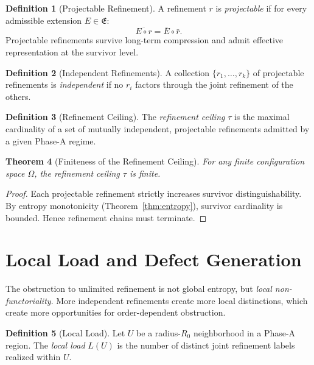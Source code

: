 \documentclass[11pt,a4paper]{article}
\newtheorem{theorem}{Theorem}[section]
\theoremstyle{definition}
\newtheorem{definition}[theorem]{Definition}
\theoremstyle{remark}
\begin{document}
\begin{definition}[Projectable Refinement]\label{def:project}
A refinement $r$ is \emph{projectable} if for every admissible extension $E \in \mathfrak{E}$:
\[
  \overline{E \circ r} = \bar{E} \circ \bar{r}.
\]
Projectable refinements survive long-term compression and admit effective representation at the survivor level.
\end{definition}

\begin{definition}[Independent Refinements]\label{def:indep}
A collection $\{r_1, \dots, r_k\}$ of projectable refinements is \emph{independent} if no $r_i$ factors through the joint refinement of the others.
\end{definition}

\begin{definition}[Refinement Ceiling]\label{def:ceiling}
The \emph{refinement ceiling} $\tau$ is the maximal cardinality of a set of mutually independent, projectable refinements admitted by a given Phase-A regime.
\end{definition}

\begin{theorem}[Finiteness of the Refinement Ceiling]\label{thm:finite}
For any finite configuration space $\Omega$, the refinement ceiling $\tau$ is finite.
\end{theorem}
\begin{proof}
Each projectable refinement strictly increases survivor distinguishability. By entropy monotonicity (Theorem~\ref{thm:entropy}), survivor cardinality is bounded. Hence refinement chains must terminate.
\end{proof}

\section{Local Load and Defect Generation}

The obstruction to unlimited refinement is not global entropy, but \emph{local non-functoriality}. More independent refinements create more local distinctions, which create more opportunities for order-dependent obstruction.

\begin{definition}[Local Load]\label{def:load}
Let $U$ be a radius-$R_0$ neighborhood in a Phase-A region. The \emph{local load} $L(U)$ is the number of distinct joint refinement labels realized within $U$.
\end{definition}
\end{document}
